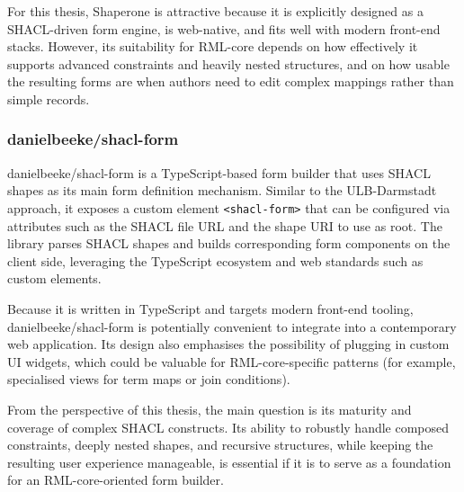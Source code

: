 For this thesis, Shaperone is attractive because it is explicitly designed as a SHACL-driven form engine, is web-native, and fits well with modern front-end stacks. However, its suitability for RML-core depends on how effectively it supports advanced constraints and heavily nested structures, and on how usable the resulting forms are when authors need to edit complex mappings rather than simple records.


\subsubsection{danielbeeke/shacl-form}

danielbeeke/shacl-form is a TypeScript-based form builder that uses SHACL shapes as its main form definition mechanism.\cite{danielbeeke-shacl-form} Similar to the ULB-Darmstadt approach, it exposes a custom element \texttt{<shacl-form>} that can be configured via attributes such as the SHACL file URL and the shape URI to use as root. The library parses SHACL shapes and builds corresponding form components on the client side, leveraging the TypeScript ecosystem and web standards such as custom elements.

Because it is written in TypeScript and targets modern front-end tooling, danielbeeke/shacl-form is potentially convenient to integrate into a contemporary web application. Its design also emphasises the possibility of plugging in custom UI widgets, which could be valuable for RML-core-specific patterns (for example, specialised views for term maps or join conditions).

From the perspective of this thesis, the main question is its maturity and coverage of complex SHACL constructs. Its ability to robustly handle composed constraints, deeply nested shapes, and recursive structures, while keeping the resulting user experience manageable, is essential if it is to serve as a foundation for an RML-core-oriented form builder.


